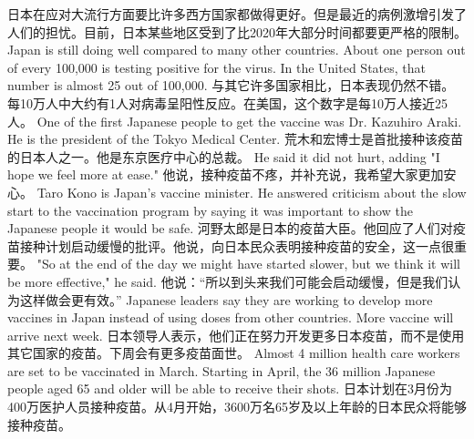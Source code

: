 日本在应对大流行方面要比许多西方国家都做得更好。但是最近的病例激增引发了人们的担忧。目前，日本某些地区受到了比2020年大部分时间都要更严格的限制。
Japan is still doing well compared to many other countries. About one person out of every 100,000 is testing positive for the virus. In the United States, that number is almost 25 out of 100,000.
与其它许多国家相比，日本表现仍然不错。每10万人中大约有1人对病毒呈阳性反应。在美国，这个数字是每10万人接近25人。
One of the first Japanese people to get the vaccine was Dr. Kazuhiro Araki. He is the president of the Tokyo Medical Center.
荒木和宏博士是首批接种该疫苗的日本人之一。他是东京医疗中心的总裁。
He said it did not hurt, adding "I hope we feel more at ease."
他说，接种疫苗不疼，并补充说，我希望大家更加安心。
Taro Kono is Japan's vaccine minister. He answered criticism about the slow start to the vaccination program by saying it was important to show the Japanese people it would be safe.
河野太郎是日本的疫苗大臣。他回应了人们对疫苗接种计划启动缓慢的批评。他说，向日本民众表明接种疫苗的安全，这一点很重要。
"So at the end of the day we might have started slower, but we think it will be more effective," he said.
他说：“所以到头来我们可能会启动缓慢，但是我们认为这样做会更有效。”
Japanese leaders say they are working to develop more vaccines in Japan instead of using doses from other countries. More vaccine will arrive next week.
日本领导人表示，他们正在努力开发更多日本疫苗，而不是使用其它国家的疫苗。下周会有更多疫苗面世。
Almost 4 million health care workers are set to be vaccinated in March. Starting in April, the 36 million Japanese people aged 65 and older will be able to receive their shots.
日本计划在3月份为400万医护人员接种疫苗。从4月开始，3600万名65岁及以上年龄的日本民众将能够接种疫苗。
